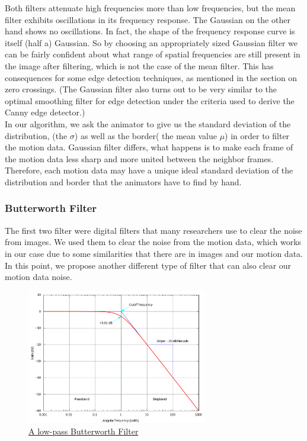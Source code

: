 Both filters attenuate high frequencies more than low frequencies, but the mean filter exhibits oscillations in its frequency response. The Gaussian on the other hand shows no oscillations. In fact, the shape of the frequency response curve is itself (half a) Gaussian. So by choosing an appropriately sized Gaussian filter we can be fairly confident about what range of spatial frequencies are still present in the image after filtering, which is not the case of the mean filter. This has consequences for some edge detection techniques, as mentioned in the section on zero crossings. (The Gaussian filter also turns out to be very similar to the optimal smoothing filter for edge detection under the criteria used to derive the Canny edge detector.)\\

In our algorithm, we ask the animator to give us the standard deviation of the distribution, (the $\sigma$) as well as the border( the mean value $\mu$) in order to filter the motion data. Gaussian filter differs, what happens is to make each frame of the motion data less sharp and more united between the neighbor frames. Therefore, each motion data may have a unique ideal standard deviation of the distribution and border that the animators have to find by hand.

 
\subsubsection*{Butterworth Filter}
The first two filter were digital filters that many researchers use to clear the noise from images. We used them to clear the noise from the motion data, which works in our case due to some similarities that there are in images and our motion data. In this point, we propose another different type of filter that can also clear our motion data noise. \\

\begin{figure}[h]
	\centering
	\includegraphics[width=0.7\textwidth]{figures/Implementation/butterworthfilter.png}
	\captionsetup{labelformat=empty}
	\caption{\href{https://upload.wikimedia.org/wikipedia/commons/thumb/6/60/Butterworth_response.svg/2560px-Butterworth_response.svg.png}
	{A low-pass Butterworth Filter}}
\end{figure}

